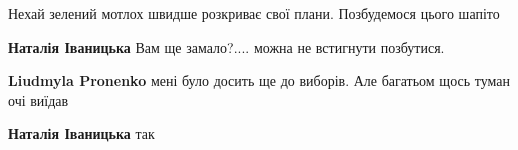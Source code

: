 \begin{itemize}
Нехай зелений мотлох швидше розкриває свої плани. Позбудемося цього шапіто

\textbf{Наталія Іваницька} Вам ще замало?.... можна не встигнути позбутися.

\textbf{Liudmyla Pronenko} мені було досить ще до виборів. Але багатьом щось туман очі виїдав

\textbf{Наталія Іваницька} так

\end{itemize}
